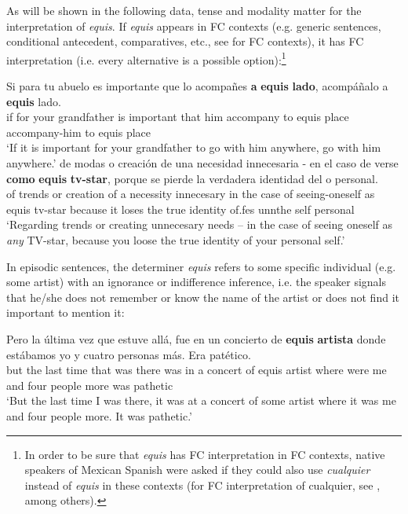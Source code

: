 \documentclass[output=paper]{langsci/langscibook}
\begin{document}
As will be shown in the following data, tense and modality matter for the interpretation of \textit{equis}. If \textit{equis} appears in  FC contexts (e.g. generic sentences, conditional antecedent, comparatives, etc., see \citealt{Aloni2010} for FC contexts), it has FC interpretation (i.e. every alternative is a possible option):\footnote{In order to be sure that \textit{equis} has FC interpretation in FC contexts, native speakers of Mexican Spanish were asked if they could also use \textit{cualquier} instead of \textit{equis} in these contexts (for FC interpretation of cualquier, see \citealt{AM2011}, among others).}

\ea\label{ex:kellert:9}
\gll Si para tu abuelo es importante que lo acompañes \textbf{a} \textbf{equis} \textbf{lado}, acompáñalo a \textbf{equis} lado.\\
if for your grandfather is important that him accompany to equis place accompany-him to equis place\\
\glt ‘If it is important for your grandfather to go with him anywhere, go with him anywhere.’
\ex 
\gll de modas o creación de una necesidad innecesaria - en el caso de verse \textbf{como} \textbf{equis} \textbf{tv-star}, porque se pierde la verdadera identidad del o personal.\\
of trends or creation of a necessity innecesary {} in the case of seeing-oneself as equis tv-star because it	loses the true identity of.fes unnthe self personal\\
\glt ‘Regarding trends or creating unnecesary needs – in the case of seeing oneself as \textit{any} TV-star, because you loose the true identity of your personal self.’
\z

In episodic sentences, the determiner \textit{equis} refers to some specific individual (e.g. some artist) with an ignorance or indifference inference, i.e. the speaker signals that he/she does not remember or know the name of the artist or does not find it important to mention it:

\ea\label{ex:kellert:11}
\gll  Pero la última vez que estuve allá, fue en un concierto de \textbf{equis} \textbf{artista} donde estábamos yo y cuatro personas más. Era patético.\\
but the last time that was there was in a concert of equis artist where were me and four people more was pathetic
\\
\glt ‘But the last time I was there, it was at a concert of some artist where it was me and four people more. It was pathetic.’
\z
\end{document}
